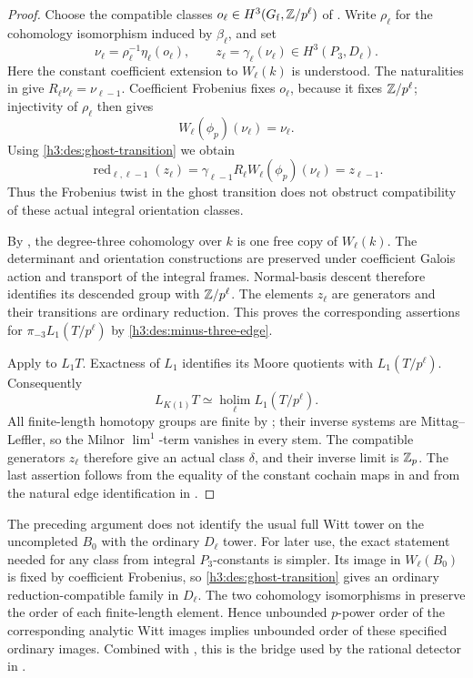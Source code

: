 \begin{proof}
Choose the compatible classes
\(o_\ell\in H^3(G_{\mathrm f},\mathbb Z/p^\ell)\)
of .
Write \(\rho_\ell\) for the cohomology isomorphism
induced by \(\beta_\ell\), and set
\[
 \nu_\ell=\rho_\ell^{-1}\eta_\ell(o_\ell),\qquad
 z_\ell=\gamma_\ell(\nu_\ell)
       \in H^3(P_3,D_\ell).
\]
Here the constant coefficient extension to \(W_\ell(k)\)
is understood.  The naturalities in
 give
\(R_\ell\nu_\ell=\nu_{\ell-1}\).
Coefficient Frobenius fixes \(o_\ell\), because it
fixes \(\mathbb Z/p^\ell\); injectivity of \(\rho_\ell\)
then gives
\[
 W_\ell(\phi_p)(\nu_\ell)=\nu_\ell.
\]
Using \eqref{h3:des:ghost-transition} we obtain
\[
 \operatorname{red}_{\ell,\ell-1}(z_\ell)
   =\gamma_{\ell-1}R_\ell
          W_\ell(\phi_p)(\nu_\ell)
   =z_{\ell-1}.
\]
Thus the Frobenius twist in the ghost transition
does not obstruct compatibility of these actual
integral orientation classes.

By , the degree-three cohomology
over \(k\) is one free copy of \(W_\ell(k)\).
The determinant and orientation constructions are
preserved under coefficient Galois action and
transport of the integral frames.  Normal-basis
descent therefore identifies its descended group
with \(\mathbb Z/p^\ell\).  The elements \(z_\ell\) are
generators and their transitions are ordinary
reduction.  This proves the corresponding assertions
for \(\pi_{-3}L_1(T/p^\ell)\) by
\eqref{h3:des:minus-three-edge}.

Apply  to \(L_1T\).  Exactness of
\(L_1\) identifies its Moore quotients with \(L_1(T/p^\ell)\).
Consequently
\[
 L_{K(1)}T\simeq
       \operatorname*{holim}_\ell L_1(T/p^\ell).
\]
All finite-length homotopy groups are finite by
; their inverse systems
are Mittag--Leffler, so the Milnor
\(\lim^1\)-term vanishes in every stem.
The compatible generators \(z_\ell\) therefore
give an actual class \(\delta\), and their inverse
limit is \(\mathbb Z_p\).
The last assertion follows from the equality of
the constant cochain maps in
 and from the natural
edge identification in
.
\end{proof}

\begin{remark}\label{h3:des:constants-order-bridge}
The preceding argument does not identify the usual
full Witt tower on the uncompleted \(B_0\) with the
ordinary \(D_\ell\) tower.  For later use, the exact
statement needed for any class from integral
\(P_3\)-constants is simpler.
Its image in \(W_\ell(B_0)\) is fixed by coefficient
Frobenius, so \eqref{h3:des:ghost-transition} gives an
ordinary reduction-compatible family in \(D_\ell\).
The two cohomology isomorphisms in
 preserve the order of
each finite-length element.
Hence unbounded \(p\)-power order of the corresponding
analytic Witt images implies unbounded order of
these specified ordinary images.  Combined with
, this is the bridge used
by the rational detector in .
\end{remark}

